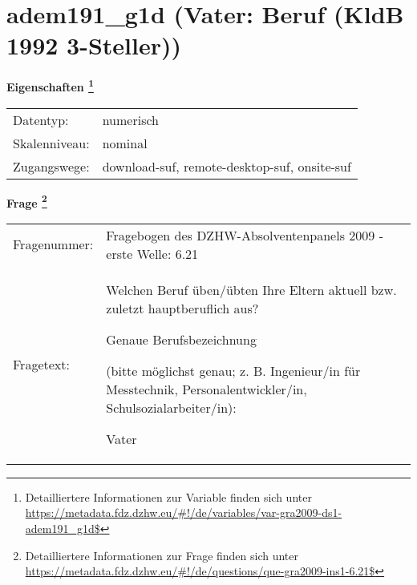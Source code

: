 
    \setcounter{footnote}{0}

    \vspace*{-1.8cm}
	\section{adem191\_g1d (Vater: Beruf (KldB 1992 3-Steller))}
	\label{section:adem191_g1d}



    \vspace*{0.5cm}
    \noindent\textbf{Eigenschaften
	\footnote{Detailliertere Informationen zur Variable finden sich unter
		\url{https://metadata.fdz.dzhw.eu/\#!/de/variables/var-gra2009-ds1-adem191_g1d$}}}\\
	\begin{tabularx}{\hsize}{@{}lX}
	Datentyp: & numerisch \\
	Skalenniveau: & nominal \\
	Zugangswege: &
	  download-suf, 
	  remote-desktop-suf, 
	  onsite-suf
 \\
    \end{tabularx}



				\vspace*{0.5cm}
                \noindent\textbf{Frage
	                \footnote{Detailliertere Informationen zur Frage finden sich unter
		              \url{https://metadata.fdz.dzhw.eu/\#!/de/questions/que-gra2009-ins1-6.21$}}}\\
				\begin{tabularx}{\hsize}{@{}lX}
					Fragenummer: &
					  Fragebogen des DZHW-Absolventenpanels 2009 - erste Welle:
					  6.21
 \\
					Fragetext: & Welchen Beruf üben/übten Ihre Eltern aktuell bzw. zuletzt hauptberuflich aus?\par  Genaue Berufsbezeichnung\par  (bitte möglichst genau; z. B. Ingenieur/in für Messtechnik, Personalentwickler/in, Schulsozialarbeiter/in):\par  Vater \\
				\end{tabularx}





